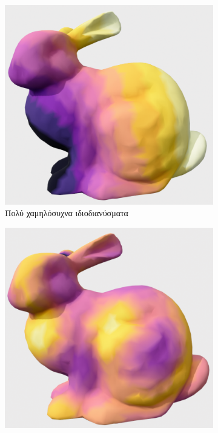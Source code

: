 \documentclass[draft]{article}
\begin{document}
\begin{figure}[h]
	\centering
	\begin{subfigure}{0.45\textwidth}
		\includegraphics[width=\textwidth]{"vl_freq.png"}
		\caption{Πολύ χαμηλόσυχνα ιδιοδιανύσματα}
		\label{fig:vis1}
	\end{subfigure}
	\begin{subfigure}{0.45\textwidth}
		\includegraphics[width=\textwidth]{"l_freq.png"}

\end{subfigure}
\end{figure}
\end{document}
